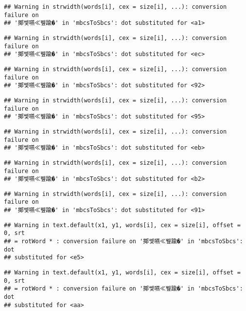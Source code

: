\documentclass[]{article}
\begin{document}
\begin{verbatim}
## Warning in strwidth(words[i], cex = size[i], ...): conversion failure on
## '揶쎛嚥≪뮆踰�' in 'mbcsToSbcs': dot substituted for <a1>
\end{verbatim}

\begin{verbatim}
## Warning in strwidth(words[i], cex = size[i], ...): conversion failure on
## '揶쎛嚥≪뮆踰�' in 'mbcsToSbcs': dot substituted for <ec>
\end{verbatim}

\begin{verbatim}
## Warning in strwidth(words[i], cex = size[i], ...): conversion failure on
## '揶쎛嚥≪뮆踰�' in 'mbcsToSbcs': dot substituted for <92>
\end{verbatim}

\begin{verbatim}
## Warning in strwidth(words[i], cex = size[i], ...): conversion failure on
## '揶쎛嚥≪뮆踰�' in 'mbcsToSbcs': dot substituted for <95>
\end{verbatim}

\begin{verbatim}
## Warning in strwidth(words[i], cex = size[i], ...): conversion failure on
## '揶쎛嚥≪뮆踰�' in 'mbcsToSbcs': dot substituted for <eb>
\end{verbatim}

\begin{verbatim}
## Warning in strwidth(words[i], cex = size[i], ...): conversion failure on
## '揶쎛嚥≪뮆踰�' in 'mbcsToSbcs': dot substituted for <b2>
\end{verbatim}

\begin{verbatim}
## Warning in strwidth(words[i], cex = size[i], ...): conversion failure on
## '揶쎛嚥≪뮆踰�' in 'mbcsToSbcs': dot substituted for <91>
\end{verbatim}

\begin{verbatim}
## Warning in text.default(x1, y1, words[i], cex = size[i], offset = 0, srt
## = rotWord * : conversion failure on '揶쎛嚥≪뮆踰�' in 'mbcsToSbcs': dot
## substituted for <e5>
\end{verbatim}

\begin{verbatim}
## Warning in text.default(x1, y1, words[i], cex = size[i], offset = 0, srt
## = rotWord * : conversion failure on '揶쎛嚥≪뮆踰�' in 'mbcsToSbcs': dot
## substituted for <aa>
\end{verbatim}
\end{document}
